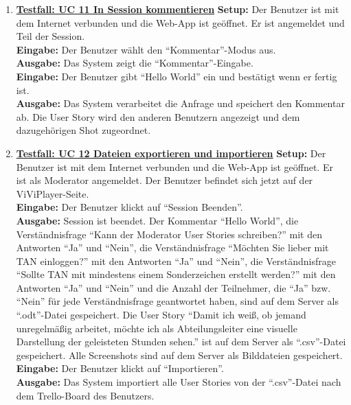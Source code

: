 \begin{enumerate}
	\item \underline{\textbf{Testfall: UC 11 In Session kommentieren}} \linebreak
	\textbf{Setup:} Der Benutzer ist mit dem Internet verbunden und die Web-App ist geöffnet. Er ist angemeldet und Teil der Session.\\
	\textbf{Eingabe:} Der Benutzer wählt den ``Kommentar''-Modus aus. \\
	\textbf{Ausgabe:} Das System zeigt die ``Kommentar''-Eingabe. \\
	\textbf{Eingabe:} Der Benutzer gibt ``Hello World'' ein und bestätigt wenn er fertig ist.\\
	\textbf{Ausgabe:} Das System verarbeitet die Anfrage und speichert den Kommentar ab. Die User Story wird den anderen Benutzern angezeigt und dem dazugehörigen Shot zugeordnet.
	
	\item \underline{\textbf{Testfall: UC 12 Dateien exportieren und importieren}} \linebreak
	\textbf{Setup:} Der Benutzer ist mit dem Internet verbunden und die Web-App ist geöffnet. Er ist als Moderator angemeldet. Der Benutzer befindet sich jetzt auf der ViViPlayer-Seite. \\
	\textbf{Eingabe:} Der Benutzer klickt auf ``Session Beenden''.\\
	\textbf{Ausgabe:} Session ist beendet. Der Kommentar ``Hello World'', die Verständnisfrage ``Kann der Moderator User Stories schreiben?'' mit den Antworten ``Ja'' und ``Nein'', die Verständnisfrage ``Möchten Sie lieber mit TAN einloggen?'' mit den Antworten ``Ja'' und ``Nein'', die Verständnisfrage ``Sollte TAN mit mindestens einem Sonderzeichen erstellt werden?'' mit den Antworten ``Ja'' und ``Nein'' und die Anzahl der Teilnehmer, die ``Ja'' bzw. ``Nein'' für jede Verständnisfrage geantwortet haben, sind auf dem Server als ``.odt''-Datei gespeichert. Die User Story ``Damit ich weiß, ob jemand unregelmäßig arbeitet, möchte ich als Abteilungsleiter eine visuelle Darstellung der geleisteten Stunden sehen.'' ist auf dem Server als ``.csv''-Datei gespeichert. Alle Screenshots sind auf dem Server als Bilddateien gespeichert.\\
	\textbf{Eingabe:} Der Benutzer klickt auf ``Importieren''. \\
	\textbf{Ausgabe:} Das System importiert alle User Stories von der ``.csv''-Datei nach dem Trello-Board 
	des Benutzers.\\ 
	

\end{enumerate}
